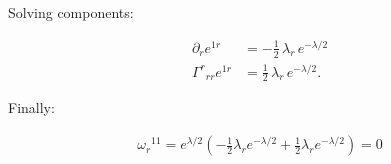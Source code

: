 \documentclass[12pt]{article}
\begin{document}
Solving components:

\begin{align*}
\partial_{r} e^{1 r} &= -\tfrac{1}{2}\,\lambda_{r}\,e^{-\lambda/2} \\
\Gamma^{r}{}_{r r} e^{1 r} &= \tfrac{1}{2}\,\lambda_{r}\,e^{-\lambda/2}.
\end{align*}

Finally:

\begin{align*}
\omega_{r}{}^{11}
= e^{\lambda/2}\left(-\tfrac{1}{2}\lambda_{r}e^{-\lambda/2}
+\tfrac{1}{2}\lambda_{r}e^{-\lambda/2}\right)=\boxed{0}
\end{align*}
\end{document}
